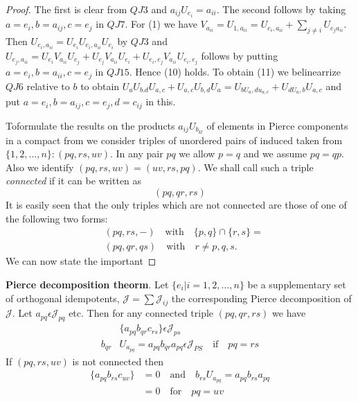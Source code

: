 \begin{proof}
The first is clear from $QJ3$ and $a_{ij}U_{e_{i}}=a_{ii}$. The second
follows by taking $a=e_{i},b=a_{ij},c=e_j$ in $QJ7$. For (1) we have
$V_{a_{ii}}=U_{1,a_{ii}}=U_{e_{i},a_{ii}}+\sum\limits_{j\neq
  i}U_{e_{j}a_{ii}}$. Then
$U_{e_{i},a_{ii}}=U_{e_{i}}U_{e_{i},a_{ii}}U_{e_{i}}$ by $QJ3$ and
  $U_{e_{j},a_{ii}}=U_{e_{i}}V_{a_{ii}}U_{e_{j}}+U_{e_{j}}V_{a_{ii}}U_{e_{i}}+U_{e_{i},e_{j}}V_{a_{ii}}U_{e_{i},e_{j}}$
  follows by putting $a=e_i, b=a_{ii},c=e_{j}$ in $QJ15$. Hence (10)
  holds. To obtain (11) we belinearrize $QJ6$ relative to $b$ to
  obtain $U_a
  U_{b.d}U_{a,c}+U_{a,c}U_{b,d}U_a=U_{bU_{a},du_{a,c}}+U_{dU_{a},b}U_{a,c}$
  and put $a=e_i, b=a_{ij},c=e_{j}, d=c_{ij}$ in this.

To\pageoriginale formulate the results on the products
$a_{ij}U_{b_{kl}}$ of elements in Pierce components in a compact from
we consider triples of unordered pairs of induced taken from
$\{1,2,\ldots,n\}:(pq,rs,uv)$. In any pair $pq$ we allow $p=q$ and we
assume $pq=qp$. Also we identify $(pq, rs, uv)=(uv, rs, pq)$. We shall
call such a triple {\em  connected} if it can be written as 
$$
(pq, qr,rs)
$$
It is easily seen that the only triples which are not connected are
those of one of the following two forms:
\begin{align*}
&(pq,rs, -)\quad\text{with}\quad\{p,q\}\cap\{r,s\}= \\
&(pq,qr,qs)\quad\text{with}\quad r\neq p,q,s.
\end{align*}
We can now state the important 
\end{proof}

\noindent
{\textbf{Pierce decomposition theorm}}. Let $\{e_i|i=1,2,\ldots,n\}$
be a supplementary set of orthogonal idempotents,
$\mathscr{J}=\sum\mathscr{J}_{ij}$ the corresponding Pierce
decomposition of $\mathscr{J}$. Let $a_{pq}\epsilon \mathscr{J}_{pq}$
etc. Then for any connected triple $(pq, qr, rs)$ we have
\begin{align*}
&\{a_{pq}b_{qr}c_{rs}\}\epsilon \mathscr{J}_{ps}\tag*{PD 1}\\
b_{qr}&U_{a_{pq}}=a_{pq}b_{qr}a_{pq}\epsilon
\mathscr{J}_{PS}\quad\text{if}\quad pq=rs\tag*{PD 2}
\end{align*}
If $(pq, rs, uv)$ is not connected then
\begin{align*}
\{a_{pq}b_{rs}c_{uv}\}&=0\quad\text{and}\quad
b_{rs}U_{a_{pq}}=a_{pq}b_{rs}a_{pq}\tag*{PD 3}\\
&=0\quad\text{for}\quad pq=uv
\end{align*}\pageoriginale

